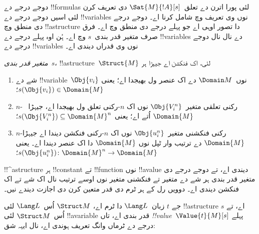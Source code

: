 \documentclass[../../../include/open-logic-section]{subfiles}
\begin{document}


\begin{explain}
دوجے درجے دے !!{formula}s لئی پورا اترن دے
تعلق~$\Sat{M}{!A}[s]$ دی تعریف کرن لئی اسیں
دوجے درجے دے !!{variable}s نوں وی تعریف وچ
شامل کرنا اے۔ دوجے درجے دی منطق وچ !!a{structure}
دا تصور اوہی اے جو پہلے درجے دی منطق وچ اے۔
فرق صرف متغیر قدر بندی~$s$ وچ اے۔ ہُن اوہ پہلے درجے دے
!!{variable}s دے نال نال دوجے درجے دے !!{variable}s نوں وی
قدراں دیندی اے۔
\end{explain}

\begin{defn}
\emph{متغیر قدر بندی}~$s$، !!a{structure}~$\Struct{M}$
لئی، اک فنکشن اے جیہڑا ہر
\begin{enumerate}
\item شے دے !!{variable}~$\Obj{v_i}$ نوں~$\Domain M$
  دے اک عنصر ول بھیجدا اے؛ یعنی
  $s(\Obj{v_i}) \in \Domain{M}$؛
\item $n$-رکنی تعلقی متغیر~$\Obj{V_i^n}$ نوں
  اک $n$-رکنی تعلق ول بھیجدا اے، جیہڑا
  ~$\Domain{M}$ اُتے اے؛ یعنی
  $s(\Obj{V_i^n}) \subseteq \Domain{M}^n$؛
\item $n$-رکنی فنکشنی متغیر~$\Obj{u_i^n}$ نوں
  اک $n$-رکنی فنکشن دیندا اے جیہڑا
  $\Domain{M}$ دے ترتیب وار ٹپل نوں $\Domain{M}$ دا اک عنصر
  دیندا اے۔ یعنی
  $s(\Obj{u_i^n})\colon \Domain{M}^n \to \Domain{M}$؛
\end{enumerate}
\end{defn}

\begin{explain}
!!^a{structure} ہر !!{constant} تے !!{function}
نوں !!a{value} دیندی اے، تے دوجے درجے دی
متغیر قدر بندی ہر شے دے متغیر تے فنکشنی متغیر
نوں اوسے ترتیب نال اک شے تے اک فنکشن دیندی اے۔ دوویں رل کے
ہر ٹرم دی قدر متعین کرن دی اجازت دیندے نیں۔
\end{explain}

\begin{defn}
جے $t$ زبان~$\Lang L$ دا ٹرم اے، $\Struct M$
اُس~$\Lang L$ لئی !!a{structure} اے، تے $s$
اُس~$\Struct M$ لئی !!a{variable} قدر بندی اے،
تاں \emph{!!{value}}~$\Value{t}{M}[s]$ پہلے
درجے دے ٹرماں وانگ تعریف ہوندی اے، نال ایہہ شق:
\begin{quote}
\end{quote}
\end{defn}
\end{document}
